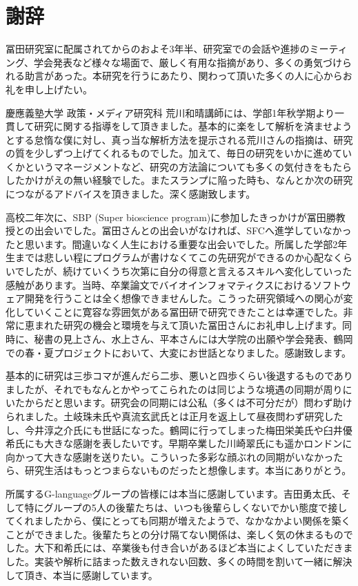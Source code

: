 \chapter*{謝辞}
冨田研究室に配属されてからのおよそ3年半、研究室での会話や進捗のミーティング、学会発表など様々な場面で、厳しく有用な指摘があり、多くの勇気づけられる助言があった。本研究を行うにあたり、関わって頂いた多くの人に心からお礼を申し上げたい。
\par
慶應義塾大学 政策・メディア研究科 荒川和晴講師には、学部1年秋学期より一貫して研究に関する指導をして頂きました。基本的に楽をして解析を済ませようとする怠惰な僕に対し、真っ当な解析方法を提示される荒川さんの指摘は、研究の質を少しずつ上げてくれるものでした。加えて、毎日の研究をいかに進めていくかというマネージメントなど、研究の方法論についても多くの気付きをもたらしたかけがえの無い経験でした。またスランプに陥った時も、なんとか次の研究につながるアドバイスを頂きました。深く感謝致します。
\par
高校二年次に、SBP (Super bioscience program)に参加したきっかけが冨田勝教授との出会いでした。冨田さんとの出会いがなければ、SFCへ進学していなかったと思います。間違いなく人生における重要な出会いでした。所属した学部2年生までは悲しい程にプログラムが書けなくてこの先研究ができるのか心配なくらいでしたが、続けていくうち次第に自分の得意と言えるスキルへ変化していった感触があります。当時、卒業論文でバイオインフォマティクスにおけるソフトウェア開発を行うことは全く想像できませんした。こうった研究領域への関心が変化していくことに寛容な雰囲気がある冨田研で研究できたことは幸運でした。非常に恵まれた研究の機会と環境を与えて頂いた冨田さんにお礼申し上げます。同時に、秘書の見上さん、水上さん、平本さんには大学院の出願や学会発表、鶴岡での春・夏プロジェクトにおいて、大変にお世話となりました。感謝致します。
\par
基本的に研究は三歩コマが進んだら二歩、悪いと四歩くらい後退するものでありましたが、それでもなんとかやってこられたのは同じような境遇の同期が周りにいたからだと思います。研究会の同期には公私（多くは不可分だが）問わず助けられました。土岐珠未氏や真流玄武氏とは正月を返上して昼夜問わず研究したし、今井淳之介氏にも世話になった。鶴岡に行ってしまった梅田栄美氏や臼井優希氏にも大きな感謝を表したいです。早期卒業した川崎翠氏にも遥かロンドンに向かって大きな感謝を送りたい。こういった多彩な顔ぶれの同期がいなかったら、研究生活はもっとつまらないものだったと想像します。本当にありがとう。
\par
所属するG-languageグループの皆様には本当に感謝しています。吉田勇太氏、そして特にグループの5人の後輩たちは、いつも後輩らしくないでかい態度で接してくれましたから、僕にとっても同期が増えたようで、なかなかよい関係を築くことができました。後輩たちとの分け隔てない関係は、楽しく気の休まるものでした。大下和希氏には、卒業後も付き合いがあるほど本当によくしていただきました。実装や解析に詰まった数えきれない回数、多くの時間を割いて一緒に解決して頂き、本当に感謝しています。
